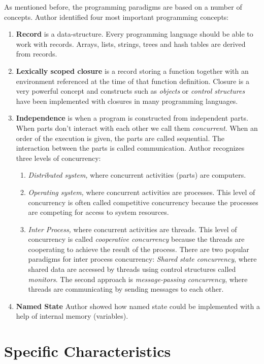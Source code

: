 \documentclass[12pt,twoside,a4paper]{report}
\begin{document}
As mentioned before, the programming paradigms are based on a number of concepts. Author identified four most important programming concepts:

\begin{enumerate}
\item \textbf{Record} is a data-structure. Every programming language should be able to work with records. Arrays, lists, strings, trees and hash tables are derived from records.
\item \textbf{Lexically scoped closure} is a record storing a function together with an environment referenced at the time of that function definition. Closure is a very powerful concept and constructs such as \textit{objects} or \textit{control structures} have been implemented with closures in many programming languages.
\item \textbf{Independence} is when a program is constructed from independent parts. When parts don’t interact with each other we call them \textit{concurrent}. When an order of the execution is given, the parts are called sequential. The interaction between the parts is called communication. Author recognizes three levels of concurrency:
    \begin{enumerate}
    \item \textit{Distributed system,} where concurrent activities (parts) are computers.
    \item \textit{Operating system,} where concurrent activities are processes. This level of concurrency is often called competitive concurrency because the processes are competing for access to system resources.
    \item \textit{Inter Process,} where concurrent activities are threads. This level of concurrency is called \textit{cooperative concurrency} because the threads are cooperating to achieve the result of the process. There are two popular paradigms for inter process concurrency: \textit{Shared state concurrency}, where shared data are accessed by threads using control structures called \textit{monitors}. The second approach is \textit{message-passing concurrency}, where threads are communicating by sending messages to each other.
    \end{enumerate}
\item \textbf{Named State} Author showed how named state could be implemented with a help of internal memory (variables).
\end{enumerate}

\section{Specific Characteristics}
\end{document}
